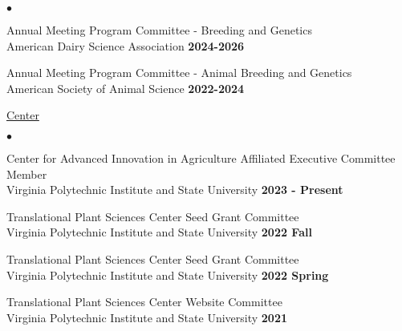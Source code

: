 \documentclass[margin,line,10pt]{res}
\newenvironment{list2}{
  \begin{list}{$\bullet$}{%
      \setlength{\itemsep}{0in}
      \setlength{\parsep}{0in} \setlength{\parskip}{0in}
      \setlength{\topsep}{0in} \setlength{\partopsep}{0in} 
      \setlength{\leftmargin}{0.2in}}}{\end{list}}
\begin{document}
\begin{resume}
\begin{list2}
  \item Annual Meeting Program Committee - Breeding and Genetics   \\
American Dairy Science Association   \hfill \textbf{2024-2026}\\

\vspace{0.3cm}

\item Annual Meeting Program Committee - Animal Breeding and Genetics   \\
American Society of Animal Science   \hfill \textbf{2022-2024}\\

\end{list2}



\begin{flushleft}
  \hspace{0.3cm} \underline{Center}
\end{flushleft}
\begin{list2}

  \item Center for Advanced Innovation in Agriculture Affiliated Executive Committee Member \\
  Virginia Polytechnic Institute and State University  \hfill {\bf 2023 - Present}\\

  \vspace{0.3cm}

    \item Translational Plant Sciences Center Seed Grant Committee \\
  Virginia Polytechnic Institute and State University  \hfill \textbf{2022 Fall}\\

  \vspace{0.3cm}
  
  \item Translational Plant Sciences Center Seed Grant Committee \\
  Virginia Polytechnic Institute and State University  \hfill \textbf{2022 Spring}\\

  \vspace{0.3cm}

\item Translational Plant Sciences Center Website Committee \\
  Virginia Polytechnic Institute and State University  \hfill \textbf{2021}\\


\end{list2}
\end{resume}
\end{document}
